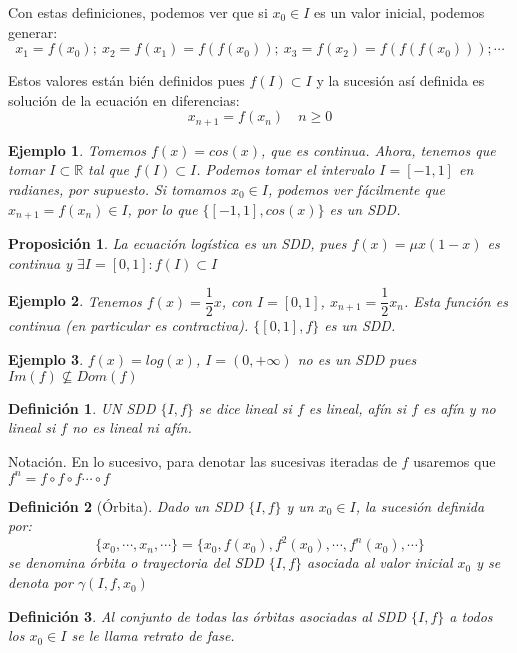 \documentclass[11pt, a4paper, titlepage]{article}
\newcommand{\R}{\mathbb{R}}
\theoremstyle{theorem-style}
\newtheorem*{nprop}{Proposición}
\theoremstyle{definition-style}
\newtheorem*{ndef}{Definición}
\theoremstyle{remark-style}
\theoremstyle{example-style}
\newtheorem*{ejemplo}{Ejemplo}
\begin{document}
Con estas definiciones, podemos ver que si $x_0 \in I$ es un valor inicial, podemos generar:
\[
x_1 = f(x_0); \ x_2 = f(x_1) = f(f(x_0)); \ x_3 = f(x_2) = f(f(f(x_0))); \cdots
\]

Estos valores están bién definidos pues $f(I) \subset I$ y la sucesión así definida es solución de la ecuación en diferencias:
\[
x_{n+1} = f(x_n) \quad n \geq 0
\]
\begin{ejemplo}
	Tomemos $f(x) = cos(x)$, que es continua. Ahora, tenemos que tomar $I \subset \R$ tal que $f(I) \subset I$. Podemos tomar el intervalo $I=[-1,1]$ en radianes, por supuesto.
	Si tomamos $x_0\in I$, podemos ver fácilmente que $x_{n+1}=f(x_n) \in I$, por lo que $\{[-1,1],cos(x)\}$ es un SDD.
\end{ejemplo}

\begin{nprop}La ecuación logística es un SDD, pues $f(x) = \mu x(1-x)$ es continua y $\exists I = [0,1]: f(I) \subset I$
	
\end{nprop}

\begin{ejemplo}
	Tenemos $f(x) = \dfrac{1}{2}x$, con $I = [0,1]$, $x_{n+1} = \dfrac{1}{2}x_n$. Esta función es continua (en particular es contractiva). $\{[0,1],f\}$ es un SDD.
\end{ejemplo}
\begin{ejemplo}
	$f(x) = log(x)$, $I=(0,+\infty)$ no es un SDD pues $Im(f) \nsubseteq Dom(f)$
\end{ejemplo}

\begin{ndef}
	UN SDD $\{I,f\}$ se dice lineal si $f$ es lineal, afín si $f$ es afín y no lineal si $f$ no es lineal ni afín.
\end{ndef}

Notación. En lo sucesivo, para denotar las sucesivas iteradas de $f$ usaremos que $f^n = f \circ f \circ f \cdots \circ f$


\begin{ndef}[Órbita]
	Dado un SDD $\{I,f\}$ y un $x_0\in I$, la sucesión definida por:
	\[
	\{x_0,\cdots, x_n , \cdots\} = \{x_0,f(x_0),f^2(x_0),\cdots, f^n(x_0), \cdots\}
	\]
	se denomina órbita o trayectoria del SDD $\{I,f\}$ asociada al valor inicial $x_0$ y se denota por $\gamma(I,f,x_0)$
\end{ndef}

\begin{ndef}
	Al conjunto de todas las órbitas asociadas al SDD $\{I,f\}$  a todos los $x_0 \in I$ se le llama retrato de fase.
\end{ndef}
\end{document}
